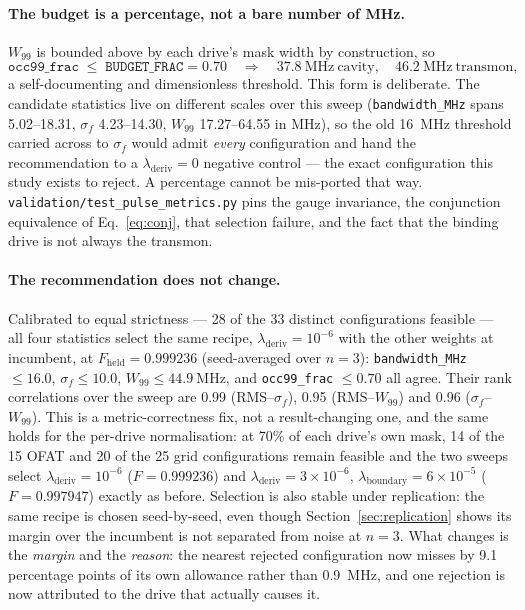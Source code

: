 \documentclass[11pt]{article}
\newcommand{\lamd}{\lambda_{\mathrm{deriv}}}
\newcommand{\lamb}{\lambda_{\mathrm{boundary}}}
\begin{document}
\paragraph{The budget is a percentage, not a bare number of MHz.}
$W_{99}$ is bounded above by each drive's mask width by construction, so
%
\begin{equation}
\texttt{occ99\_frac} \;\leq\; \texttt{BUDGET\_FRAC} = 0.70
\quad\Longrightarrow\quad
\SI{37.8}{\mega\hertz}\ \text{cavity},\quad \SI{46.2}{\mega\hertz}\ \text{transmon},
\end{equation}
%
a self-documenting and dimensionless threshold. This form is deliberate. The candidate statistics
live on different scales over this sweep (\texttt{bandwidth\_MHz} spans \numrange{5.02}{18.31},
$\sigma_f$ \numrange{4.23}{14.30}, $W_{99}$ \numrange{17.27}{64.55} in MHz), so the old
\SI{16}{\mega\hertz} threshold carried across to $\sigma_f$ would admit \emph{every}
configuration and hand the recommendation to a $\lamd = 0$ negative control --- the exact
configuration this study exists to reject. A percentage cannot be mis-ported that way.
\texttt{validation/test\_pulse\_metrics.py} pins the gauge invariance, the conjunction
equivalence of Eq.~\eqref{eq:conj}, that selection failure, and the fact that the binding drive is
not always the transmon.

\paragraph{The recommendation does not change.}
Calibrated to equal strictness --- 28 of the 33 distinct configurations feasible --- all four
statistics select the same recipe, $\lamd = 10^{-6}$ with the other weights at incumbent, at
$F_{\mathrm{held}} = \num{0.999236}$ (seed-averaged over $n = 3$):
\texttt{bandwidth\_MHz} $\leq 16.0$, $\sigma_f \leq 10.0$,
$W_{99} \leq \SI{44.9}{\mega\hertz}$, and \texttt{occ99\_frac} $\leq 0.70$ all agree. Their rank
correlations over the sweep are \num{0.99} (RMS--$\sigma_f$), \num{0.95} (RMS--$W_{99}$) and
\num{0.96} ($\sigma_f$--$W_{99}$). This is a metric-correctness fix, not a result-changing one,
and the same holds for the per-drive normalisation: at 70\% of each drive's own mask, 14 of the 15
OFAT and 20 of the 25 grid configurations remain feasible and the two sweeps select
$\lamd = 10^{-6}$ ($F = \num{0.999236}$) and $\lamd = 3\times10^{-6}$, $\lamb = 6\times10^{-5}$
($F = \num{0.997947}$) exactly as before. Selection is also stable under replication: the same
recipe is chosen seed-by-seed, even though Section~\ref{sec:replication} shows its margin over
the incumbent is not separated from noise at $n = 3$. What changes is the \emph{margin} and the
\emph{reason}: the nearest rejected configuration now misses by 9.1 percentage points of its own
allowance rather than \SI{0.9}{\mega\hertz}, and one rejection is now attributed to the drive that
actually causes it.
\end{document}
